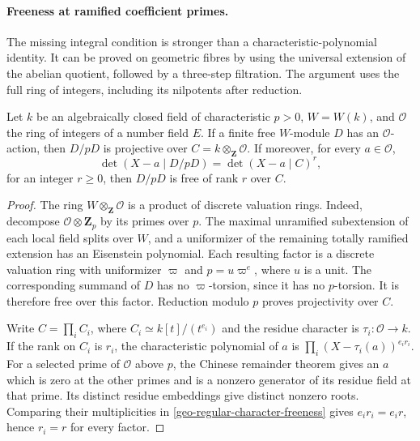 \paragraph{Freeness at ramified coefficient primes.}
The missing integral condition is stronger than a characteristic-polynomial
identity. It can be proved on geometric fibres by using the universal
extension of the abelian quotient, followed by a three-step filtration.
The argument uses the full ring of integers, including its nilpotents
after reduction.

\begin{lemma}\label{geo-witt-coefficient-freeness}
Let $k$ be an algebraically closed field of characteristic $p>0$,
$W=W(k)$, and $\mathcal O$ the ring of integers of a number field $E$.
If a finite free $W$-module $D$ has an $\mathcal O$-action, then $D/pD$
is projective over $C=k\otimes_{\mathbf Z}\mathcal O$.
If moreover, for every $a\in\mathcal O$,
\begin{equation}\label{geo-regular-character-freeness}
 \det(X-a\mid D/pD)
 =\det(X-a\mid C)^r,
\end{equation}
for an integer $r\geq0$, then $D/pD$ is free of rank $r$ over $C$.
\end{lemma}
\begin{proof}
The ring $W\otimes_{\mathbf Z}\mathcal O$ is a product of discrete
valuation rings. Indeed, decompose $\mathcal O\otimes\mathbf Z_p$ by
its primes over $p$. The maximal unramified subextension of each local
field splits over $W$, and a uniformizer of the remaining totally
ramified extension has an Eisenstein polynomial. Each resulting factor
is a discrete valuation ring with uniformizer $\varpi$ and
$p=u\varpi^e$, where $u$ is a unit.
The corresponding summand of $D$ has no $\varpi$-torsion, since it has
no $p$-torsion. It is therefore free over this factor. Reduction modulo
$p$ proves projectivity over $C$.

Write $C=\prod_i C_i$, where $C_i\simeq k[t]/(t^{e_i})$ and the
residue character is $\tau_i:\mathcal O\to k$. If the rank on $C_i$
is $r_i$, the characteristic polynomial of $a$ is
$\prod_i(X-\tau_i(a))^{e_i r_i}$.
For a selected prime of $\mathcal O$ above $p$, the Chinese remainder
theorem gives an $a$ which is zero at the other primes and is a
nonzero generator of its residue field at that prime. Its distinct
residue embeddings give distinct nonzero roots. Comparing their
multiplicities in \eqref{geo-regular-character-freeness} gives
$e_i r_i=e_i r$, hence $r_i=r$ for every factor.
\end{proof}

